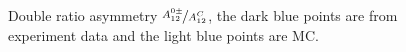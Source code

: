 \begin{figure}[H]
  \caption{Double ratio asymmetry $\nicefrac{A^{0\pm}_{12}}{A^C_{12}}$, the dark blue points are from experiment data and the light blue points are MC.}
  \label{fig:exp_pi0_eta_ratio2}
\end{figure}



